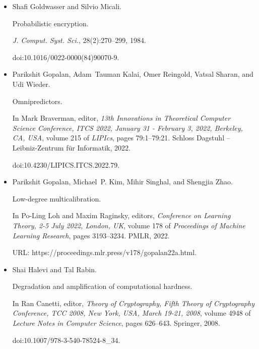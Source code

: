 \begin{itemize}
\item[] 
[6]

Shafi Goldwasser and Silvio Micali.


Probabilistic encryption.


\emph{J. Comput. Syst. Sci.}, 28(2):270–299, 1984.


doi:10.1016/0022-0000(84)90070-9.





\item[] 
[7]

Parikshit Gopalan, Adam Tauman Kalai, Omer Reingold, Vatsal Sharan, and Udi
Wieder.


Omnipredictors.


In Mark Braverman, editor, \emph{13th Innovations in Theoretical
Computer Science Conference, ITCS 2022, January 31 - February 3, 2022,
Berkeley, CA, USA}, volume 215 of \emph{LIPIcs}, pages 79:1–79:21. Schloss
Dagstuhl – Leibniz-Zentrum für Informatik, 2022.


doi:10.4230/LIPICS.ITCS.2022.79.





\item[] 
[8]

Parikshit Gopalan, Michael P. Kim, Mihir Singhal, and Shengjia Zhao.


Low-degree multicalibration.


In Po-Ling Loh and Maxim Raginsky, editors, \emph{Conference on
Learning Theory, 2-5 July 2022, London, UK}, volume 178 of \emph{Proceedings
of Machine Learning Research}, pages 3193–3234. PMLR, 2022.


URL: https://proceedings.mlr.press/v178/gopalan22a.html.





\item[] 
[9]

Shai Halevi and Tal Rabin.


Degradation and amplification of computational hardness.


In Ran Canetti, editor, \emph{Theory of Cryptography, Fifth Theory of
Cryptography Conference, TCC 2008, New York, USA, March 19-21, 2008},
volume 4948 of \emph{Lecture Notes in Computer Science}, pages 626–643.
Springer, 2008.


doi:10.1007/978-3-540-78524-8\_34.






\end{itemize}
